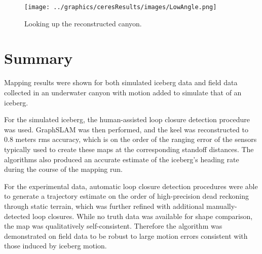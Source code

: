  \begin{figure}[!htb]
   \centering
   \texttt{[image: ../graphics/ceresResults/images/LowAngle.png]} %
   \caption{Looking up the reconstructed canyon.}
   \label{fig:RealDataSolution5}
\end{figure}


\section{Summary}

Mapping results were shown for both simulated iceberg data and field data collected in an underwater canyon with motion added to simulate that of an iceberg. 

For the simulated iceberg, the human-assisted loop closure detection procedure was used. GraphSLAM was then performed, and the keel was reconstructed to 0.8 meters rms accuracy, which is on the order of the ranging error of the sensors typically used to create these maps at the corresponding standoff distances. The algorithms also produced an accurate estimate of the iceberg's heading rate during the course of the mapping run.

For the experimental data, automatic loop closure detection procedures were able to generate a trajectory estimate on the order of high-precision dead reckoning through static terrain, which was further refined with additional manually-detected loop closures.  While no truth data was available for shape comparison, the map was qualitatively self-consistent. Therefore the algorithm was demonstrated on field data to be robust to large motion errors consistent with those induced by iceberg motion.



